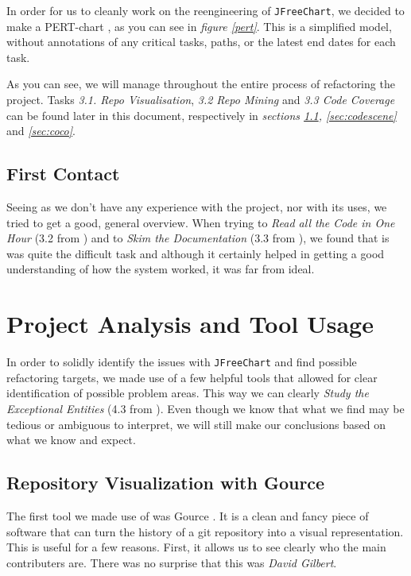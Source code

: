 \documentclass[11pt]{article}
\begin{document}
	In order for us to cleanly work on the reengineering of \texttt{JFreeChart}, we decided to make a \textsf{PERT}-chart \cite{pert}, as you can see in \textsl{figure \ref{pert}}. This is a simplified model, without annotations of any critical tasks, paths, or the latest end dates for each task. 
   
	As you can see, we will manage throughout the entire process of refactoring the project. Tasks \textsl{3.1. Repo Visualisation}, \textsl{3.2 Repo Mining} and \textsl{3.3 Code Coverage} can be found later in this document, respectively in \textsl{sections \ref{sec:gource}, \ref{sec:codescene}} and \textsl{\ref{sec:coco}}. 
   
	
	\subsection{First Contact}
	Seeing as we don't have any experience with the project, nor with its uses, we tried to get a good, general overview. When trying to \textsl{Read all the Code in One Hour} (3.2 from \cite{demeyer2009object}) and to \textsl{Skim the Documentation} (3.3 from \cite{demeyer2009object}), we found that is was quite the difficult task and although it certainly helped in getting a good understanding of how the system worked, it was far from ideal.
	
	
	\section{Project Analysis and Tool Usage}
	In order to solidly identify the issues with \texttt{JFreeChart} and find possible refactoring targets, we made use of a few helpful tools that allowed for clear identification of possible problem areas. This way we can clearly \textsl{Study the Exceptional Entities} (4.3 from \cite{demeyer2009object}). Even though we know that what we find may be tedious or ambiguous to interpret, we will still make our conclusions based on what we know and expect.
	
	\subsection{Repository Visualization with Gource}
	\label{sec:gource}
	The first tool we made use of was \textsf{Gource} \cite{gource}. It is a clean and fancy piece of software that can turn the history of a git repository into a visual representation. This is useful for a few reasons. First, it allows us to see clearly who the main contributers are. There was no surprise that this was \textsl{David Gilbert}.
	
\end{document}
